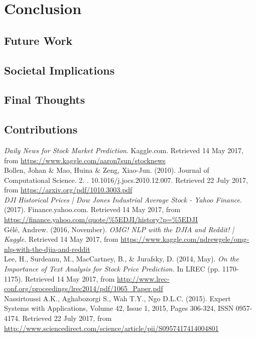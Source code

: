 \documentclass[11pt,a4paper]{article}
\begin{document}
\section{Conclusion}
\subsection{Future Work}
\subsection{Societal Implications}
\subsection{Final Thoughts}

\subsection{Contributions}




\textit{Daily News for Stock Market Prediction}. Kaggle.com. Retrieved 14 May 2017, from \url{https://www.kaggle.com/aaron7sun/stocknews}\\

Bollen, Johan & Mao, Huina & Zeng, Xiao-Jun. (2010).  Journal of Computational Science. 2. . 10.1016/j.jocs.2010.12.007. Retrieved 22 July 2017, from \url{https://arxiv.org/pdf/1010.3003.pdf}\\


\textit{DJI Historical Prices | Dow Jones Industrial Average Stock - Yahoo Finance}. (2017). Finance.yahoo.com. Retrieved 14 May 2017, from \url{https://finance.yahoo.com/quote/\%5EDJI/history?p=\%5EDJI}\\

G\'el\'e, Andrew. (2016, November). \textit{OMG! NLP with the DJIA and Reddit! | Kaggle.} Retrieved 14 May 2017, from \url{https://www.kaggle.com/ndrewgele/omg-nlp-with-the-djia-and-reddit}\\

Lee, H., Surdeanu, M., MacCartney, B., \& Jurafsky, D. (2014, May). \textit{On the Importance of Text Analysis for Stock Price Prediction.} In LREC (pp. 1170-1175). Retrieved 14 May 2017, from \url{http://www.lrec-conf.org/proceedings/lrec2014/pdf/1065_Paper.pdf}\\

Nassirtoussi A.K., Aghabozorgi S., Wah T.Y., Ngo D.L.C. (2015).  Expert Systems with Applications, Volume 42, Issue 1, 2015, Pages 306-324, ISSN 0957-4174. Retrieved 22 July 2017, from \url{http://www.sciencedirect.com/science/article/pii/S0957417414004801}\\
\end{document}
